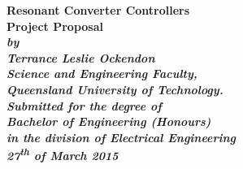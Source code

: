 \begin{titlepage}
\renewcommand{\baselinestretch}{1.0}
\begin{center}
\vspace*{35mm}
\Huge\bf
		Resonant Converter Controllers\\
\huge 
\rm
        Project Proposal\\
\vspace{20mm}
\large\sl
		by\\
		Terrance Leslie Ockendon
		\medskip\\
\rm
		Science and Engineering Faculty,\\
		Queensland University of Technology.\\
\vspace{30mm}
		Submitted for the degree of\\
		Bachelor of Engineering (Honours)
		\smallskip\\
\normalsize
		in the division of Electrical Engineering
		\medskip\\
\large
		27\textsuperscript{th} of March 2015
\end{center}
\end{titlepage}
